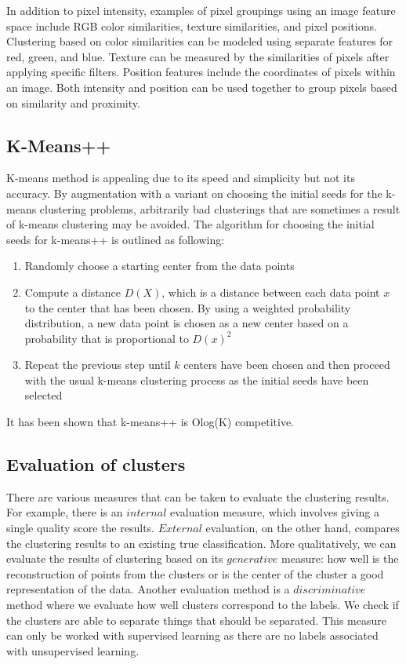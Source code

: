 \documentclass{article}
\begin{document}
In addition to pixel intensity, examples of pixel groupings using an image feature space include RGB color similarities, texture similarities, and pixel positions. Clustering based on color similarities can be modeled using separate features for red, green, and blue. Texture can be measured by the similarities of pixels after applying specific filters. Position features include the coordinates of pixels within an image. Both intensity and position can be used together to group pixels based on similarity and proximity.

\subsection{K-Means++}
K-means method is appealing due to its speed and simplicity but not its accuracy. By augmentation with a variant on choosing the initial seeds for the k-means clustering problems, arbitrarily bad clusterings that are sometimes a result of k-means clustering may be avoided. The algorithm for choosing the initial seeds for k-means++ is outlined as following:
\begin{enumerate}
    \item Randomly choose a starting center from the data points
    \item Compute a distance $D(X)$, which is a distance between each data point $x$ to the center that has been chosen. By using a weighted probability distribution, a new data point is chosen as a new center based on a probability that is proportional to $D(x)^2$
    \item Repeat the previous step until $k$ centers have been chosen and then proceed with the usual k-means clustering process as the initial seeds have been selected
\end{enumerate}
It has been shown that k-means++ is Olog(K) competitive.

\subsection{Evaluation of clusters}
There are various measures that can be taken to evaluate the clustering results. For example, there is an $internal$ evaluation measure, which involves giving a single quality score the results. $External$ evaluation, on the other hand, compares the clustering results to an existing true classification. More qualitatively, we can evaluate the results of clustering based on its $generative$ measure: how well is the reconstruction of points from the clusters or is the center of the cluster a good representation of the data. Another evaluation method is a $discriminative$ method where we evaluate how well clusters correspond to the labels. We check if the clusters are able to separate things that should be separated. This measure can only be worked with supervised learning as there are no labels associated with unsupervised learning. 
\end{document}
